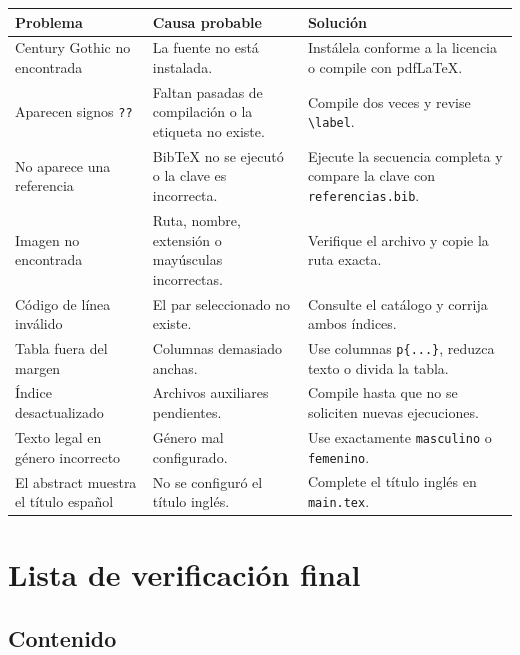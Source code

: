 \documentclass[12pt,a4paper,oneside]{report}
\begin{document}
\begingroup
\small
\singlespacing
\begin{longtable}{|p{4.2cm}|p{4.2cm}|p{4.2cm}|}
  \hline
  \textbf{Problema} & \textbf{Causa probable} & \textbf{Solución} \\
  \hline
  Century Gothic no encontrada & La fuente no está instalada. & Instálela conforme a la licencia o compile con pdfLaTeX. \\
  \hline
  Aparecen signos \texttt{??} & Faltan pasadas de compilación o la etiqueta no existe. & Compile dos veces y revise \texttt{\textbackslash label}. \\
  \hline
  No aparece una referencia & BibTeX no se ejecutó o la clave es incorrecta. & Ejecute la secuencia completa y compare la clave con \texttt{referencias.bib}. \\
  \hline
  Imagen no encontrada & Ruta, nombre, extensión o mayúsculas incorrectas. & Verifique el archivo y copie la ruta exacta. \\
  \hline
  Código de línea inválido & El par seleccionado no existe. & Consulte el catálogo y corrija ambos índices. \\
  \hline
  Tabla fuera del margen & Columnas demasiado anchas. & Use columnas \texttt{p\{...\}}, reduzca texto o divida la tabla. \\
  \hline
  Índice desactualizado & Archivos auxiliares pendientes. & Compile hasta que no se soliciten nuevas ejecuciones. \\
  \hline
  Texto legal en género incorrecto & Género mal configurado. & Use exactamente \texttt{masculino} o \texttt{femenino}. \\
  \hline
  El abstract muestra el título español & No se configuró el título inglés. & Complete el título inglés en \texttt{main.tex}. \\
  \hline
\end{longtable}
\endgroup

\chapter{Lista de verificación final}

\section{Contenido}
\end{document}
